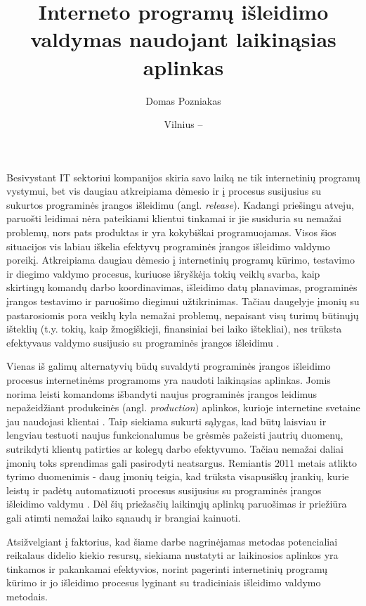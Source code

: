 \documentclass{VUMIFPSkursinis}
\institute{Informatikos institutas}
\title{Interneto programų išleidimo valdymas naudojant laikinąsias aplinkas}
\author{Domas Pozniakas}
\date{Vilnius – \the\year}
\begin{document}
\maketitle

\tableofcontents

Besivystant IT sektoriui kompanijos skiria savo laiką ne tik internetinių programų vystymui, bet vis daugiau atkreipiama dėmesio ir į procesus susijusius su sukurtos programinės įrangos išleidimu (angl. \textit{release}). Kadangi priešingu atveju, paruošti leidimai nėra pateikiami klientui tinkamai ir jie susiduria su nemažai problemų, nors pats produktas ir yra kokybiškai programuojamas. Visos šios situacijos vis labiau iškelia efektyvų programinės įrangos išleidimo valdymo poreikį. Atkreipiama daugiau dėmesio į internetinių programų kūrimo, testavimo ir diegimo valdymo procesus, kuriuose išryškėja tokių veiklų svarba, kaip skirtingų komandų darbo koordinavimas, išleidimo datų planavimas, programinės įrangos testavimo ir paruošimo diegimui užtikrinimas. Tačiau daugelyje įmonių su pastarosiomis pora veiklų kyla nemažai problemų, nepaisant visų turimų būtinųjų išteklių (t.y. tokių, kaip žmogiškieji, finansiniai bei laiko ištekliai), nes trūksta efektyvaus valdymo susijusio su programinės įrangos išleidimu \cite{SaltPirmas}. 


Vienas iš galimų alternatyvių būdų suvaldyti programinės įrangos išleidimo procesus internetinėms programoms yra naudoti laikinąsias aplinkas. Jomis norima leisti komandoms išbandyti naujus programinės įrangos leidimus nepažeidžiant produkcinės (angl. \textit{production}) aplinkos, kurioje internetine svetaine jau naudojasi klientai \cite{SaltAntras}. Taip siekiama sukurti sąlygas, kad būtų laisviau ir lengviau testuoti naujus funkcionalumus be grėsmės pažeisti jautrių duomenų, sutrikdyti klientų patirties ar kolegų darbo efektyvumo. Tačiau nemažai daliai įmonių toks sprendimas gali pasirodyti neatsargus. Remiantis 2011 metais atlikto tyrimo duomenimis - daug įmonių teigia, kad trūksta visapusiškų įrankių, kurie leistų ir padėtų automatizuoti procesus susijusius su programinės įrangos išleidimo valdymu \cite{SaltPirmas}. Dėl šių priežasčių laikinųjų aplinkų paruošimas ir priežiūra gali atimti nemažai laiko sąnaudų ir brangiai kainuoti.

 Atsižvelgiant į faktorius, kad šiame darbe nagrinėjamas metodas potencialiai reikalaus didelio kiekio resursų, siekiama nustatyti ar laikinosios aplinkos yra tinkamos ir pakankamai efektyvios, norint pagerinti internetinių programų kūrimo ir jo išleidimo procesus lyginant su tradiciniais išleidimo valdymo metodais.
\end{document}
